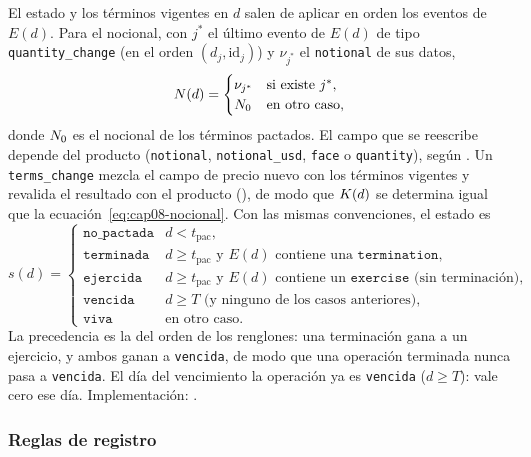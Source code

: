 El estado y los términos vigentes en $d$ salen de aplicar en orden los eventos de $E(d)$. Para el nocional, con $j^{*}$ el último evento de $E(d)$ de tipo \texttt{quantity\_change} (en el orden $(d_j, \mathrm{id}_j)$) y $\nu_{j^{*}}$ el \texttt{notional} de sus datos,
\begin{equation}\label{eq:cap08-nocional}
  N(d) =
  \begin{cases}
    \nu_{j^{*}} & \text{si existe } j^{*},\\
    N_0 & \text{en otro caso,}
  \end{cases}
\end{equation}
donde $N_0$ es el nocional de los términos pactados. El campo que se reescribe depende del producto (\texttt{notional}, \texttt{notional\_usd}, \texttt{face} o \texttt{quantity}), según . Un \texttt{terms\_change} mezcla el campo de precio nuevo con los términos vigentes y revalida el resultado con el producto (), de modo que $K(d)$ se determina igual que la ecuación~\eqref{eq:cap08-nocional}. Con las mismas convenciones, el estado es
\begin{equation}\label{eq:cap08-estado}
  s(d) =
  \begin{cases}
    \texttt{no\_pactada} & d < t_{\mathrm{pac}},\\
    \texttt{terminada} & d \ge t_{\mathrm{pac}} \text{ y } E(d) \text{ contiene una } \texttt{termination},\\
    \texttt{ejercida} & d \ge t_{\mathrm{pac}} \text{ y } E(d) \text{ contiene un } \texttt{exercise} \text{ (sin terminación)},\\
    \texttt{vencida} & d \ge T \text{ (y ninguno de los casos anteriores)},\\
    \texttt{viva} & \text{en otro caso.}
  \end{cases}
\end{equation}
La precedencia es la del orden de los renglones: una terminación gana a un ejercicio, y ambos ganan a \texttt{vencida}, de modo que una operación terminada nunca pasa a \texttt{vencida}. El día del vencimiento la operación ya es \texttt{vencida} ($d \ge T$): vale cero ese día. Implementación: .

\subsubsection*{Reglas de registro}

